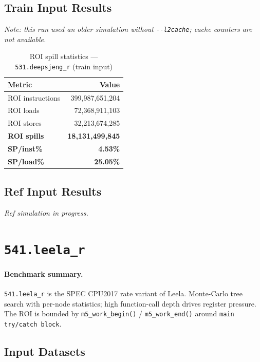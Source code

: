 \documentclass[11pt,a4paper]{article}
\begin{document}
\subsection{Train Input Results}

\textit{Note: this run used an older simulation without \texttt{-{}-l2cache}; cache counters are not available.}


\begin{table}[H]
\centering
\caption{ROI spill statistics --- \texttt{531.deepsjeng\_r} (train input)}
\label{tab:deepsjeng_train_roi}
\begin{tabular}{lr}
\toprule
\textbf{Metric} & \textbf{Value} \\
\midrule
ROI instructions & 399,987,651,204 \\
ROI loads        & 72,368,911,103 \\
ROI stores       & 32,213,674,285 \\
\textbf{ROI spills}   & \textbf{18,131,499,845} \\
\textbf{SP/inst\%}   & \textbf{4.53\%} \\
\textbf{SP/load\%}   & \textbf{25.05\%} \\
\bottomrule
\end{tabular}
\end{table}

\subsection{Ref Input Results}
\textit{Ref simulation in progress.}



\section{\texttt{541.leela\_r}}
\label{sec:leela}

\paragraph{Benchmark summary.}
\texttt{541.leela\_r} is the SPEC CPU2017 rate variant of Leela.
Monte-Carlo tree search with per-node statistics; high function-call depth drives register pressure.
The ROI is bounded by \texttt{m5\_work\_begin()} / \texttt{m5\_work\_end()}
around \texttt{main try/catch block}.

\subsection{Input Datasets}
\end{document}
